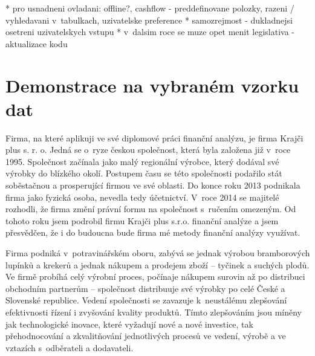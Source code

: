 * pro usnadneni ovladani: offline?, cashflow - preddefinovane polozky, razeni / vyhledavani v~tabulkach, uzivatelske preference
* samozrejmost - dukladnejsi osetreni uzivatelskych vstupu
* v~dalsim roce se muze opet menit legislativa - aktualizace kodu

\section{Demonstrace na vybraném vzorku dat}
Firma, na které aplikuji ve své diplomové práci finanční analýzu, je firma Krajči plus s. r. o. Jedná se o~ryze českou společnost, která byla založena již v~roce 1995. Společnost začínala
jako malý regionální výrobce, který dodával své výrobky do blízkého okolí. Postupem času se této společnosti podařilo stát soběstačnou a prosperující firmou ve své oblasti. Do konce roku 2013 podnikala firma jako fyzická osoba, nevedla tedy účetnictví. V~roce 2014 se majitelé rozhodli, že firma změní právní formu na společnost s~ručením omezeným. Od tohoto roku jsem podrobil firmu Krajči plus s.r.o. finanční analýze a jsem přesvědčen, že i do budoucna bude firma mé metody finanční analýzy využívat.

Firma podniká v~potravinářském oboru, zabývá se jednak výrobou bramborových lupínků a krekerů a jednak nákupem a prodejem zboží – tyčinek a suchých plodů. Ve firmě probíhá celý výrobní proces, počínaje nákupem surovin až po distribuci obchodním partnerům – společnost distribuuje své výrobky po celé České a Slovenské republice. Vedení společnosti se zavazuje k~neustálému zlepšování efektivnosti řízení i zvyšování kvality produktů. Tímto zlepšováním jsou míněny jak technologické inovace, které vyžadují nové a nové investice, tak přehodnocování a zkvalitňování jednotlivých procesů ve vedení, výrobě a ve vztazích s~odběrateli a dodavateli.

